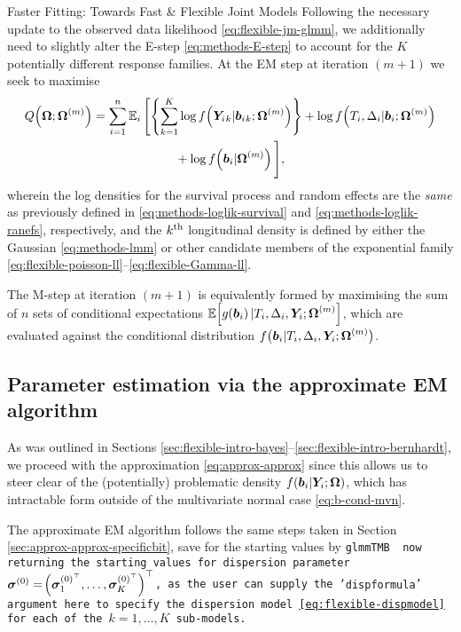 \begin{chapter}{\label{cha:flexible}Faster Fitting: Towards Fast \& Flexible Joint Models}
Following the necessary update to the observed data likelihood \eqref{eq:flexible-jm-glmm}, we additionally need to slightly alter the E-step \eqref{eq:methods-E-step} to account for the $K$ potentially different response families. At the EM step at iteration $(m+1)$ we seek to maximise 
\begin{equation}
    \begin{aligned}
        Q\!\left(\bm{\mathrm{\Omega}};\bm{\mathrm{\Omega}}^{(m)}\right)=\sum_{i=1}^n\operatorname{\mathbb{E}}_i\Bigg[&\!\left\{\sum_{k=1}^K\log     f\!\left(\bm{Y}_i{_k}|\bm{b}_i{_k};\bm{\mathrm{\Omega}}^{(m)}\right)\right\}+
        \log f\!\left( T_i,\Delta_i|\bm{b}_i;\bm{\mathrm{\Omega}}^{(m)}\right) \\&\qquad+ 
        \log f\!\left(\bm{b}_i|\bm{\mathrm{\Omega}}^{(m)}\right)\Bigg],
    \end{aligned}
\label{eq:flexible-Estep}
\end{equation}
wherein the log densities for the survival process and random effects are the \textit{same} as previously defined in \eqref{eq:methods-loglik-survival} and \eqref{eq:methods-loglik-ranefs}, respectively, and the $k^{\text{th}}$ longitudinal density is defined by either the Gaussian \eqref{eq:methods-lmm} or other candidate members of the exponential family \eqref{eq:flexible-poisson-ll}--\eqref{eq:flexible-Gamma-ll}.

The M-step at iteration $(m+1)$ is equivalently formed by maximising the sum of $n$ sets of conditional expectations $\operatorname{\mathbb{E}}\!\left[ g\!\left(\bm{b}_i\right)|T_i,\Delta_i,\bm{Y}_i;\bm{\mathrm{\Omega}}^{(m)}\right]$, which are evaluated against the conditional distribution $f\big(\bm{b}_i|T_i,\Delta_i,\bm{Y}_i;\bm{\mathrm{\Omega}}^{(m)}\big)$. 

\subsection{Parameter estimation via the approximate EM algorithm}
As was outlined in Sections \ref{sec:flexible-intro-bayes}--\ref{sec:flexible-intro-bernhardt}, we proceed with the approximation \eqref{eq:approx-approx} since this allows us to steer clear of the (potentially) problematic density $f\!\left(\bm{b}_i|\bm{Y}_i;\bm{\mathrm{\Omega}}\right)$, which has intractable form outside of the multivariate normal case \eqref{eq:b-cond-mvn}.

The approximate EM algorithm follows the same steps taken in Section \ref{sec:approx-approx-specificbit}, save for the starting values by \tt{glmmTMB} \citep{R-glmmTMB} now returning the starting values for dispersion parameter $\bm{\sigma}^{(0)}=\!\left(\bm{\sigma}^{(0){^\top}}_1,\dots,\bm{\sigma}^{(0){^\top}}_K\right)^\top$, as the user can supply the `\tt{dispformula}' argument here to specify the dispersion model \eqref{eq:flexible-dispmodel} for each of the $k=1,\dots,K$ sub-models.


\end{chapter}
